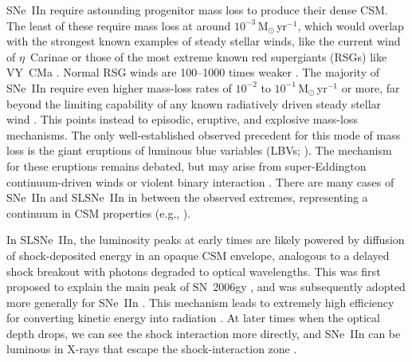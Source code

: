 \documentclass[fleqn,usenatbib,useAMS]{mnras}
\begin{document}
SNe~IIn require astounding progenitor mass loss to produce their dense
CSM.  The least of these require mass loss at around $10^{-3}$\,M$_{\odot}$\,yr$^{-1}$, 
which would overlap with the strongest known examples of
steady stellar winds, like the current wind of $\eta$~Carinae
\citep{smith03,hillier06} or those of the most extreme known red
supergiants (RSGs) like VY~CMa \citep{smith09,smith09sn05ip,decin06}.  Normal
RSG winds are 100--1000 times weaker \citep{beasor20}.  The majority
of SNe~IIn require even higher mass-loss rates of $10^{-2}$
to $10^{-1}$\,M$_{\odot}$\,yr$^{-1}$ or more, far beyond the limiting
capability of any known radiatively driven steady stellar wind
\citep{so06,smith14}.  This points instead to episodic, eruptive, and
explosive mass-loss mechanisms.  The only well-established observed
precedent for this mode of mass loss is the giant eruptions of
luminous blue variables (LBVs; \citealt{smith11lbv}).  The mechanism for
these eruptions remains debated, but may arise from super-Eddington
continuum-driven winds \citep{so06,owocki04,owocki17,quataert16} or violent binary
interaction \citep{smith18,st06}.  There are many cases of SNe~IIn and
SLSNe~IIn in between the observed extremes, representing a continuum
in CSM properties (e.g., \citealt{dickinson23}).


In SLSNe~IIn, the luminosity peaks at early times are likely
powered by diffusion of shock-deposited energy in an opaque CSM
envelope, analogous to a delayed shock breakout with photons degraded
to optical wavelengths.  This was first proposed to explain the main
peak of SN~2006gy \citep{sm07}, and was subsequently adopted more
generally for SNe~IIn \citep{bl11,ci11}. This mechanism leads to
extremely high efficiency for converting kinetic energy into radiation
\citep{sm07,vm10}.  At later times when the optical depth drops, we
can see the shock interaction more directly, and SNe~IIn can be
luminous in X-rays that escape the shock-interaction zone
\citep{chandra09,chandra12,chandra22,pooley02,tsuna21}.  
\end{document}
